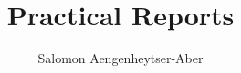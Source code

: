 \documentclass{report}
\title{Practical Reports}
\author{Salomon Aengenheytser-Aber}
\begin{document}
  \nocite{*}

  \maketitle
 
  \tableofcontents
  
  
  
  
  
  
  
  \newpage
  
  
  
\end{document}
